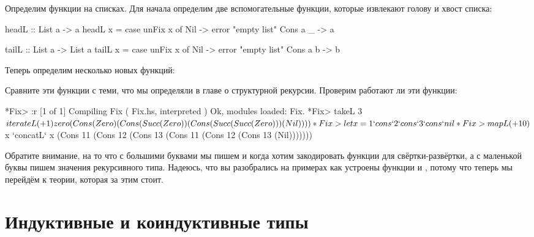 
Определим функции на списках. Для начала определим
две вспомогательные функции, которые извлекают голову и хвост списка:

\begin{code}
headL :: List a -> a
headL x = case unFix x of
    Nil         -> error "empty list"
    Cons a _    -> a

tailL :: List a -> List a
tailL x = case unFix x of
    Nil         -> error "empty list"
    Cons a b    -> b
\end{code}

Теперь определим несколько новых функций:


Сравните эти функции с теми, что мы определяли в главе 
о структурной рекурсии. Проверим работают ли эти функции:

\begin{code}
*Fix> :r
[1 of 1] Compiling Fix              ( Fix.hs, interpreted )
Ok, modules loaded: Fix.
*Fix> takeL 3 $ iterateL (+1) zero
(Cons (Zero) (Cons (Succ (Zero)) (Cons (Succ (Succ (Zero))) (Nil))))
*Fix> let x = 1 `cons` 2 `cons` 3 `cons` nil
*Fix> mapL (+10) $ x `concatL` x
(Cons 11 (Cons 12 (Cons 13 (Cons 11 (Cons 12 (Cons 13 (Nil)))))))
\end{code}

Обратите внимание, на то что с большими буквами мы пишем
 и  когда хотим закодировать функции 
для свёртки-развёртки, а с маленькой буквы пишем значения
рекурсивного типа. Надеюсь, что вы разобрались на примерах
как устроены функции  и , потому что
теперь мы перейдём к теории, которая за этим стоит.

\section{Индуктивные и коиндуктивные типы}

